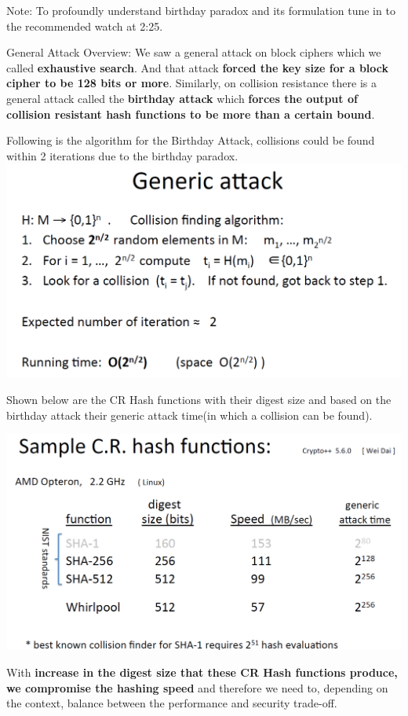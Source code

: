 \documentclass[11pt]{article}
\makeatletter
\def\maxwidth{\ifdim\Gin@nat@width>\linewidth\linewidth
    \else\Gin@nat@width\fi}
\let\Oldincludegraphics\includegraphics
\renewcommand{\includegraphics}[1]{\Oldincludegraphics[width=.8\maxwidth]{#1}}
\makeatother
\begin{document}
Note: To profoundly understand birthday paradox and its formulation tune
in to the recommended watch at 2:25.

General Attack Overview: We saw a general attack on block ciphers which
we called \textbf{exhaustive search}. And that attack \textbf{forced the
key size for a block cipher to be 128 bits or more}. Similarly, on
collision resistance there is a general attack called the
\textbf{birthday attack} which \textbf{forces the output of collision
resistant hash functions to be more than a certain bound}.

Following is the algorithm for the Birthday Attack, collisions could be
found within 2 iterations due to the birthday paradox.
\includegraphics{./Images/BirthdayAttackAlgo.png}

Shown below are the CR Hash functions with their digest size and based
on the birthday attack their generic attack time(in which a collision
can be found).

\includegraphics{./Images/SampleCRHashFxn.png}

With \textbf{increase in the digest size that these CR Hash functions
produce, we compromise the hashing speed} and therefore we need to,
depending on the context, balance between the performance and security
trade-off.
\end{document}
